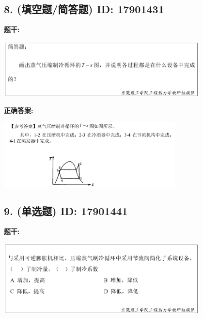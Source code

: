 \documentclass[12pt]{article}
\begin{document}
\vspace{0.5em}\hrulefill\vspace{1em}

\subsection*{8. (填空题/简答题) \small ID: 17901431}

\textbf{题干:}


\begin{center}\includegraphics[width=0.8\textwidth, height=0.25\textheight, keepaspectratio]{question_8_17901431/title_img_1.png}\end{center}

\textbf{正确答案:}

\begin{center}\includegraphics[width=0.7\textwidth, height=0.2\textheight, keepaspectratio]{question_8_17901431/correct_answer_1_img_1.png}\end{center}

\vspace{0.5em}\hrulefill\vspace{1em}

\subsection*{9. (单选题) \small ID: 17901441}

\textbf{题干:}


\begin{center}\includegraphics[width=0.8\textwidth, height=0.25\textheight, keepaspectratio]{question_9_17901441/title_img_1.png}\end{center}
\end{document}
